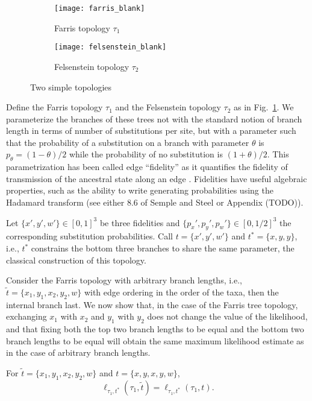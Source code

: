 \begin{figure}
\centering
\begin{subfigure}{.45\linewidth}
\centering
\texttt{[image: farris\_blank]}
\caption[short]{Farris topology $\tau_1$}
\end{subfigure}
\begin{subfigure}{.45\linewidth}
\centering
\texttt{[image: felsenstein\_blank]}
\caption[short]{Felsenstein topology $\tau_2$}
\end{subfigure}
\caption{Two simple topologies}
\label{fig:farris-fels-top}
\end{figure}

Define the Farris topology $\tau_1$ and the Felsenstein topology $\tau_2$ as in Fig.~\ref{fig:farris-fels-top}.
We parameterize the branches of these trees not with the standard notion of branch length in terms of number of substitutions per site, but with a parameter such that the probability of a substitution on a branch with parameter $\theta$ is $p_\theta = (1-\theta)/2$ while the probability of no substitution is $(1+\theta)/2$.
This parametrization has been called edge ``fidelity'' as it quantifies the fidelity of transmission of the ancestral state along an edge \cite{Matsen2007-jq}.
Fidelities have useful algebraic properties, such as the ability to write generating probabilities using the Hadamard transform (see either 8.6 of Semple and Steel \cite{Semple2003-em} or Appendix (TODO)).

Let $\{x',y',w'\}\in[0,1]^3$ be three fidelities and $\{p_x',p_y',p_w'\}\in[0,1/2]^3$ the corresponding substitution probabilities.
Call $t=\{x',y',w'\}$ and $t^*=\{x,y,y\}$, i.e., $t^*$ constrains the bottom three branches to share the same parameter, the classical construction of this topology.

Consider the Farris topology with arbitrary branch lengths, i.e., $\tilde{t}=\{x_1,y_1,x_2,y_2,w\}$ with edge ordering in the order of the taxa, then the internal branch last.
We now show that, in the case of the Farris tree topology, exchanging $x_1$ with $x_2$ and $y_1$ with $y_2$ does not change the value of the likelihood, and that fixing both the top two branch lengths to be equal and the bottom two branch lengths to be equal will obtain the same maximum likelihood estimate as in the case of arbitrary branch lengths.

\begin{lemma}
For $\tilde{t}=\{x_1,y_1,x_2,y_2,w\}$ and $t=\{x,y,x,y,w\}$,
$$
\ell_{\tau_1,t^*}(\tau_1, \tilde{t}) = \ell_{\tau_1,t^*}(\tau_1, t).
$$
\end{lemma}


